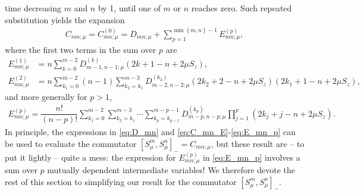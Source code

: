 \documentclass[aps,notitlepage,nofootinbib,11pt]{revtex4-1}
\newcommand{\f}[2]{\dfrac{#1}{#2}} %
\newcommand{\p}[1]{\left(#1\right)} %
\renewcommand{\sp}[1]{\left[#1\right]} %
\renewcommand{\set}[1]{\left\{#1\right\}} %
\newcommand{\bmu}{{\bar\mu}}
\newcommand{\1}{\mathds{1}}
\begin{document}
time decreasing $m$ and $n$ by 1, until one of $m$ or $n$ reaches
zero.  Such repeated substitution yields the expansion
\begin{align}
  C_{mn;\mu}
  = C_{mn;\mu}^{(0)}
  = D_{mn;\mu}
  + \sum_{p=1}^{\min\set{m,n}-1} E_{mn;\mu}^{(p)},
  \label{eq:C_mn_E}
\end{align}
where the first two terms in the sum over $p$ are
\begin{align}
  E_{mn;\mu}^{(1)}
  &= n \sum_{k=0}^{m-2} D_{m-1,n-1;\mu}^{(k)}
  \p{2k+1-n+2\mu S_z}, \\
  E_{mn;\mu}^{(2)}
  &= n \sum_{k_1=0}^{m-2} \p{n-1} \sum_{k_2=k_1}^{m-3}
  D_{m-2,n-2;\mu}^{(k_2)}
  \p{2k_2+2-n+2\mu S_z} \p{2k_1+1-n+2\mu S_z},
\end{align}
and more generally for $p>1$,
\begin{align}
  E_{mn;\mu}^{(p)}
  = \f{n!}{\p{n-p}!}
  \sum_{k_1=0}^{m-2} \sum_{k_2=k_1}^{m-3} \cdots\sum_{k_p=k_{p-1}}^{m-p-1}
  D_{m-p,n-p;\mu}^{(k_p)} \prod_{j=1}^p \p{2k_j+j-n+2\mu S_z}.
  \label{eq:E_mn_p}
\end{align}
In principle, the expressions in \eqref{eq:D_mn} and
\eqref{eq:C_mn_E}-\eqref{eq:E_mn_p} can be used to evaluate the
commutator $\sp{S_\mu^m,S_\bmu^n}_- = C_{mn;\mu}$, but these result
are -- to put it lightly -- quite a mess: the expression for
$E_{mn;\mu}^{(p)}$ in \eqref{eq:E_mn_p} involves a sum over $p$
mutually dependent intermediate variables!  We therefore devote the
rest of this section to simplifying our result for the commutator
$\sp{S_\mu^m,S_\bmu^n}_-$.
\end{document}
